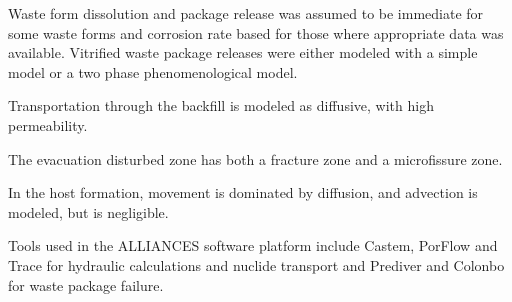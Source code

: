 




Waste form dissolution and package release was assumed to be immediate for some
waste forms and corrosion rate based for those where appropriate data was
available. Vitrified waste package releases were either modeled with a simple
model or a two phase phenomenological model. 


Transportation through the backfill is modeled as diffusive, with high
permeability.

The evacuation disturbed zone has both a fracture zone and a microfissure zone.

In the host formation, movement is dominated by diffusion, and advection is
modeled, but is negligible.



% 

Tools used in the ALLIANCES software platform include Castem, PorFlow and Trace
for hydraulic calculations and nuclide transport and Prediver and Colonbo for
waste package failure.

